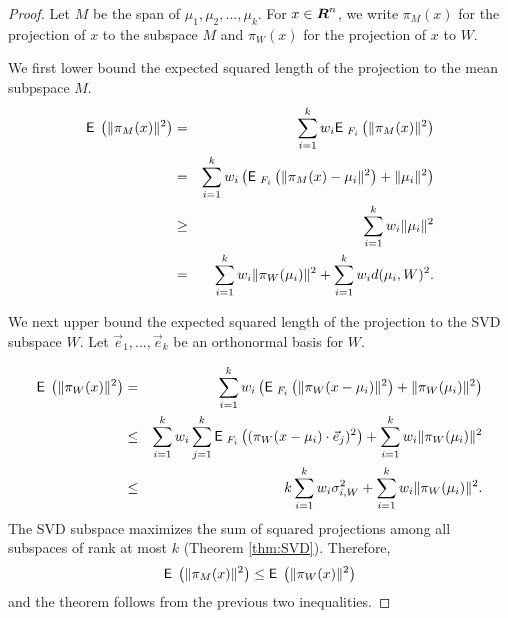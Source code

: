 \documentclass{book}
\numberwithin{exercise}{chapter}
\begin{document}

\begin{proof}
Let $M$ be the span of $\mu_1,\mu_2,\ldots,\mu_k$.
For $x\in \mbox{\mbox{\boldmath $R$}}^n$, we write $\pi_M(x)$ for the projection of
$x$ to the subspace $M$ and $\pi_W(x)$ for the projection of $x$ to $W$.

We first lower bound the expected squared length of the projection to the mean subpspace $M$.
\begin{eqnarray*}
\hbox{{\sf E}\;}\left(\|\pi_M(x)\|^2\right) &=& \sum_{i=1}^k w_i\hbox{{\sf E}\;}_{F_i}\left(\|\pi_M(x)\|^2\right)\\
&=& \sum_{i=1}^k w_i\left(\hbox{{\sf E}\;}_{F_i}\left(\|\pi_M(x)- \mu_i\|^2\right)
                           +\|\mu_i\|^2\right)\\
   &\geq& \sum_{i=1}^k w_i\|\mu_i\|^2\\
&=& \sum_{i=1}^k w_i \|\pi_W(\mu_i)\|^2 +
            \sum_{i=1}^k w_i d(\mu_i,W)^2.
\end{eqnarray*}

We next upper bound the expected squared length of the projection to the SVD subspace $W$.
Let $\vec e_1,...,\vec e_k$ be an orthonormal basis for $W$.

\begin{eqnarray*}
\hbox{{\sf E}\;}\left(\|\pi_W(x)\|^2\right) &=&\sum_{i=1}^k w_i\left( \hbox{{\sf E}\;}_{F_i}\left(\|\pi_W(x-\mu_i)\|^2\right)
                                 +\|\pi_W(\mu_i)\|^2\right)\\
&\leq&\sum_{i=1}^kw_i\sum_{j=1}^k\hbox{{\sf E}\;}_{F_i}\left((\pi_W(x-\mu_i)\cdot \vec e_j)^2\right)+
 \sum_{i=1}^k w_i\|\pi_W(\mu_i)\|^2\\
&\leq& k\sum_{i=1}^k w_i\sigma_{i,W}^2 +
    \sum_{i=1}^k w_i\|\pi_W(\mu_i)\|^2.
\end{eqnarray*}
The SVD subspace maximizes the sum of squared projections
among all subspaces of rank at most $k$ (Theorem \ref{thm:SVD}).
Therefore,
\[
\hbox{{\sf E}\;}\left(\|\pi_M(x)\|^2\right) \le \hbox{{\sf E}\;}\left(\|\pi_W(x)\|^2\right)
\]
and the theorem follows from the previous two inequalities.
\end{proof}
\end{document}
